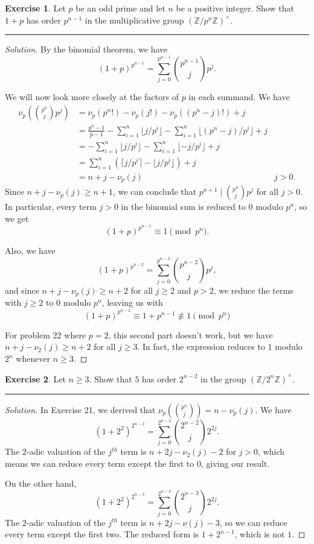\documentclass{article}
\theoremstyle{definition}
\newtheorem{exercise}{Exercise}
\begin{document}
\pagebreak

\begin{exercise}
  Let $p$ be an odd prime and let $n$ be a positive integer. Show that $1+p$ has order $p^{n-1}$ in the multiplicative group $(\mathbb{Z}/p^n\mathbb{Z})^\times$.
\end{exercise}
\hrule
\begin{proof}[Solution]
  By the binomial theorem, we have $$(1+p)^{p^{n-1}} = \sum_{j=0}^{p^{n-1}}\binom{p^{n-1}}{j}p^j.$$

  We will now look more closely at the factors of $p$ in each summand. We have
  \begin{align*}
    \nu_p\left(\binom{p^{n}}{j}p^j\right) &= \nu_p(p^{n}!) - \nu_p(j!) - \nu_p((p^{n}-j)!) + j \\
    &= \frac{p^n-1}{p-1} - \sum_{i = 1}^n\lfloor{j/p^i}\rfloor - \sum_{i=1}^n\lfloor(p^n-j)/p^i\rfloor + j \\
    &= - \sum_{i = 1}^n\lfloor{j/p^i}\rfloor - \sum_{i=1}^n\lfloor-j/p^i\rfloor + j \\
    &= \sum_{i=1}^n (\lceil j/p^i\rceil - \lfloor j/p^i\rfloor) + j \\
    &= n + j - \nu_p(j) & j > 0.
  \end{align*}
  Since $n + j - \nu_p(j) \ge n+1$, we can conclude that $p^{n+1}\mid \binom{p^{n}}{j}p^j$ for all $j > 0$. In particular, every term $j>0$ in the binomial sum is reduced to 0 modulo $p^n$, so we get
  $$(1+p)^{p^{n-1}} \equiv 1 \pmod{p^n}.$$

  Also, we have
  $$(1+p)^{p^{n-2}} = \sum_{j=0}^{p^{n-2}}\binom{p^{n-2}}{j}p^j,$$
  and since $n + j - \nu_p(j) \ge n+2$ for all $j\ge 2$ and $p > 2$, we reduce the terms with $j\ge 2$ to 0 modulo $p^n$, leaving us with
  $$(1+p)^{p^{n-2}} \equiv 1 + p^{n-1} \not\equiv 1 \pmod{p^n}$$

  For problem 22 where $p=2$, this second part doesn't work, but we have $n + j - \nu_2(j) \ge n+2$ for all $j\ge 3$. In fact, the expression reduces to $1$ modulo $2^n$ whenever $n \ge 3$.

\end{proof}

\pagebreak

\begin{exercise}
  Let $n\ge 3$. Show that $5$ has order $2^{n-2}$ in the group $(\mathbb{Z}/2^n\mathbb{Z})^\times$.
\end{exercise}
\hrule
\begin{proof}[Solution]
  In Exercise 21, we derived that $\nu_p\left(\binom{p^n}{j}\right) = n - \nu_p(j)$. We have
  $$(1+2^2)^{2^{n-2}} = \sum_{j=0}^{2^{n-2}}\binom{2^{n-2}}{j}2^{2j}.$$
  The $2$-adic valuation of the $j^{th}$ term is $n+2j-\nu_2(j)-2$ for $j>0$, which means we can reduce every term except the first to 0, giving our result.

  On the other hand,
  $$(1+2^2)^{2^{n-3}} = \sum_{j=0}^{2^{n-3}}\binom{2^{n-3}}{j}2^{2j}.$$
  The $2$-adic valuation of the $j^{th}$ term is $n+2j-\nu(j)-3$, so we can reduce every term except the first two. The reduced form is $1+2^{n-1}$, which is not $1$.
\end{proof}
\end{document}
